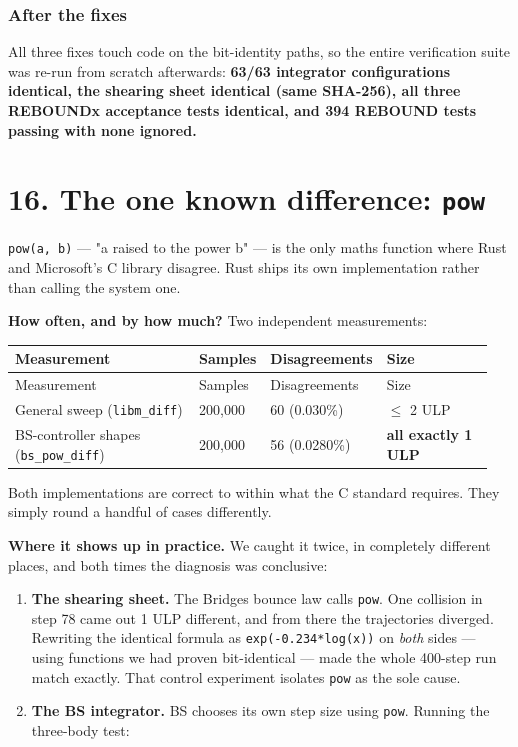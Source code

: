\documentclass[11pt]{article}
\begin{document}
\subsubsection{After the fixes}

All three fixes touch code on the bit-identity paths, so the entire verification suite was re-run from scratch afterwards: \textbf{63/63 integrator configurations identical, the shearing sheet identical (same SHA-256), all three REBOUNDx acceptance tests identical, and 394 REBOUND tests passing with none ignored.}

\section{16. The one known difference: \texttt{pow}}

\texttt{pow(a, b)} --- "a raised to the power b" --- is the only maths function where Rust and Microsoft's C library disagree. Rust ships its own implementation rather than calling the system one.

\textbf{How often, and by how much?} Two independent measurements:

\begin{longtable}{L{0.438\linewidth}L{0.099\linewidth}L{0.158\linewidth}L{0.255\linewidth}}
\toprule
Measurement & Samples & Disagreements & Size \\
\midrule
\endfirsthead
\toprule
Measurement & Samples & Disagreements & Size \\
\midrule
\endhead
General sweep (\texttt{libm\_diff}) & 200,000 & 60 (0.030\%) & \(\leq\) 2 ULP \\
BS-controller shapes (\texttt{bs\_pow\_diff}) & 200,000 & 56 (0.0280\%) & \textbf{all exactly 1 ULP} \\
\bottomrule
\end{longtable}

Both implementations are correct to within what the C standard requires. They simply round a handful of cases differently.

\textbf{Where it shows up in practice.} We caught it twice, in completely different places, and both times the diagnosis was conclusive:

\begin{enumerate}
\item \textbf{The shearing sheet.} The Bridges bounce law calls \texttt{pow}. One collision in step 78 came out 1 ULP different, and from there the trajectories diverged. Rewriting the identical formula as \texttt{exp(-0.234*log(x))} on \emph{both} sides --- using functions we had proven bit-identical --- made the whole 400-step run match exactly. That control experiment isolates \texttt{pow} as the sole cause.
\item \textbf{The BS integrator.} BS chooses its own step size using \texttt{pow}. Running the three-body test:
\end{enumerate}
\end{document}
